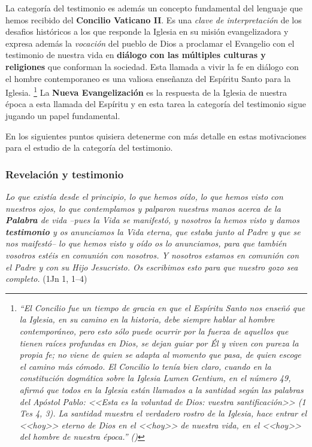 \documentclass[../main.tex]{subfiles}
\begin{document}
La categoría del testimonio es además un concepto fundamental del lenguaje que hemos recibido del \textbf{Concilio Vaticano II}. Es una \emph{clave de interpretación} de los desafios históricos a los que responde la Iglesia en su misión evangelizadora y expresa además la \emph{vocación} del pueblo de Dios a proclamar el Evangelio con el testimonio de nuestra vida en \textbf{diálogo con las múltiples culturas y religiones} que conforman la sociedad. Esta llamada a vivir la fe en diálogo con el hombre contemporaneo es una valiosa enseñanza del Espíritu Santo para la Iglesia.
\footnote{ 
\emph{
``El Concilio fue un tiempo de gracia en que el Espíritu Santo nos enseñó que la Iglesia, en su camino en la historia, debe siempre hablar al hombre contemporáneo, pero esto sólo puede ocurrir por la fuerza de aquellos que tienen raíces profundas en Dios, se dejan guiar por Él y viven con pureza la propia fe; no viene de quien se adapta al momento que pasa, de quien escoge el camino más cómodo. El Concilio lo tenía bien claro, cuando en la constitución dogmática sobre la Iglesia Lumen Gentium, en el número 49, afirmó que todos en la Iglesia están llamados a la santidad según las palabras del Apóstol Pablo: <<Esta es la voluntad de Dios: vuestra santificación>> (1 Tes 4, 3). La santidad muestra el verdadero rostro de la Iglesia, hace entrar el <<hoy>> eterno de Dios en el <<hoy>> de nuestra vida, en el <<hoy>> del hombre de nuestra época.'' (\cite{benxvi})
}
}
La \textbf{Nueva Evangelización} es la respuesta de la Iglesia de nuestra época a esta llamada del Espíritu y en esta tarea la categoría del testimonio sigue jugando un papel fundamental. 

En los siguientes puntos quisiera detenerme con más detalle en estas motivaciones para el estudio de la categoría del testimonio.

\subsubsection{Revelación y testimonio}

\emph{Lo que existía desde el principio, lo que hemos oído,
lo que hemos visto con nuestros ojos,
lo que contemplamos
y palparon nuestras manos
acerca de la \textbf{Palabra} de vida
--pues la Vida se manifestó,
y nosotros la hemos visto y damos \textbf{testimonio}
y os anunciamos la Vida eterna,
que estaba junto al Padre y que se nos maifestó--
lo que hemos visto y oído os lo anunciamos,
para que también vosotros estéis en comunión con nosotros.
Y nosotros estamos en comunión con el Padre y con su Hijo Jesucristo.
Os escribimos esto para que nuestro gozo sea completo.} (1Jn 1, 1--4)
\end{document}
